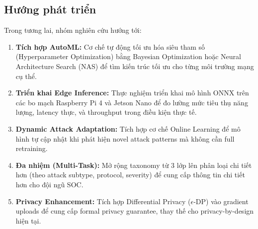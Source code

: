 \documentclass[12pt,a4paper]{article}
\begin{document}
\subsection{Hướng phát triển}
Trong tương lai, nhóm nghiên cứu hướng tới:
\begin{enumerate}
    \item \textbf{Tích hợp AutoML:} Cơ chế tự động tối ưu hóa siêu tham số (Hyperparameter Optimization) bằng Bayesian Optimization hoặc Neural Architecture Search (NAS) để tìm kiến trúc tối ưu cho từng môi trường mạng cụ thể.
    \item \textbf{Triển khai Edge Inference:} Thực nghiệm triển khai mô hình ONNX trên các bo mạch Raspberry Pi 4 và Jetson Nano để đo lường mức tiêu thụ năng lượng, latency thực, và throughput trong điều kiện thực tế.
    \item \textbf{Dynamic Attack Adaptation:} Tích hợp cơ chế Online Learning để mô hình tự cập nhật khi phát hiện novel attack patterns mà không cần full retraining.
    \item \textbf{Đa nhiệm (Multi-Task):} Mở rộng taxonomy từ 3 lớp lên phân loại chi tiết hơn (theo attack subtype, protocol, severity) để cung cấp thông tin chi tiết hơn cho đội ngũ SOC.
    \item \textbf{Privacy Enhancement:} Tích hợp Differential Privacy ($\epsilon$-DP) vào gradient uploads để cung cấp formal privacy guarantee, thay thế cho privacy-by-design hiện tại.
\end{enumerate}

\end{document}
